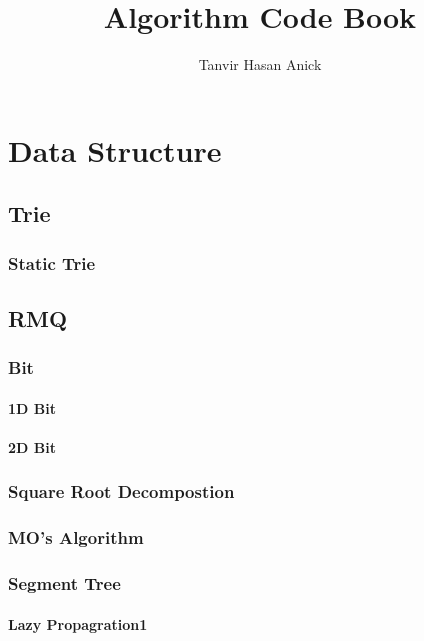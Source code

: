 \documentclass[11pt]{report}
\title{Algorithm Code Book}
\author{Tanvir Hasan Anick}
\begin{document}
\maketitle
\tableofcontents
\newpage

\chapter{Data Structure}
\section{Trie}
\subsection{Static Trie}

\section{RMQ}
\subsection{Bit}
\subsubsection{1D Bit}

\subsubsection{2D Bit}

\subsection{Square Root Decompostion}

\subsection{MO's Algorithm}

\subsection{Segment Tree}
\subsubsection{Lazy Propagration1}

\end{document}
